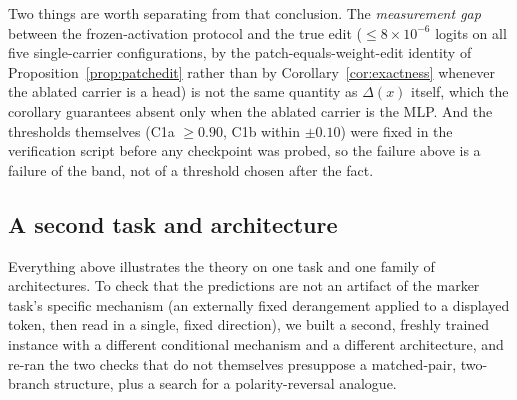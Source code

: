 \documentclass[11pt,a4paper]{article}
\begin{document}
Two things are worth separating from that conclusion. The \emph{measurement
gap} between the frozen-activation protocol and the true edit ($\le
8\times10^{-6}$ logits on all five single-carrier configurations, by the
patch-equals-weight-edit identity of Proposition~\ref{prop:patchedit} rather
than by Corollary~\ref{cor:exactness} whenever the ablated carrier is a head)
is not the same quantity as $\Delta(x)$ itself, which the corollary
guarantees absent only when the ablated carrier is the MLP. And the
thresholds themselves (C1a $\ge0.90$, C1b within $\pm0.10$) were fixed in the
verification script before any checkpoint was probed, so the failure above is
a failure of the band, not of a threshold chosen after the fact.

\subsection{A second task and architecture}
\label{sec:second-task}

Everything above illustrates the theory on one task and one family of
architectures. To check that the predictions are not an artifact of the
marker task's specific mechanism (an externally fixed derangement applied
to a displayed token, then read in a single, fixed direction), we built a
second, freshly trained instance with a different conditional mechanism and a
different architecture, and re-ran the two checks that do not themselves
presuppose a matched-pair, two-branch structure, plus a search for a
polarity-reversal analogue.
\end{document}
